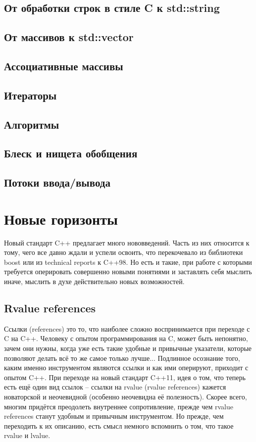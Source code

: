 \documentclass[a4paper,12pt,oneside]{article}
\begin{document}
\subsection{От обработки строк в стиле C к std::string}

\subsection{От массивов к std::vector}

\subsection{Ассоциативные массивы}

\subsection{Итераторы}

\subsection{Алгоритмы}

\subsection{Блеск и нищета обобщения}

\subsection{Потоки ввода/вывода}

\pagebreak
\section{Новые горизонты}

Новый стандарт C++ предлагает много нововведений. Часть из них относится к тому, чего все давно ждали и успели освоить, что перекочевало из библиотеки boost или из technical reports к C++98. Но есть и такие, при работе с которыми требуется оперировать совершенно новыми понятиями и заставлять себя мыслить иначе, мыслить в духе действительно новых возможностей.

\subsection{Rvalue references}

Ссылки (references) это то, что наиболее сложно воспринимается при переходе с C на C++. Человеку с опытом программирования на C, может быть непонятно, зачем они нужны, когда уже есть такие удобные и привычные указатели, которые позволяют делать всё то же самое только лучше... Подлинное осознание того, каким именно инструментом являются ссылки и как ими оперируют, приходит с опытом C++. При переходе на новый стандарт C++11, идея о том, что теперь есть ещё один вид ссылок -- ссылки на rvalue (rvalue references) кажется новаторской и неочевидной (особенно неочевидна её полезность). Скорее всего, многим придётся преодолеть внутреннее сопротивление, прежде чем rvalue references станут удобным и привычным инструментом. Но прежде, чем переходить к их описанию, есть смысл немного вспомнить о том, что такое rvalue и lvalue.
\end{document}
